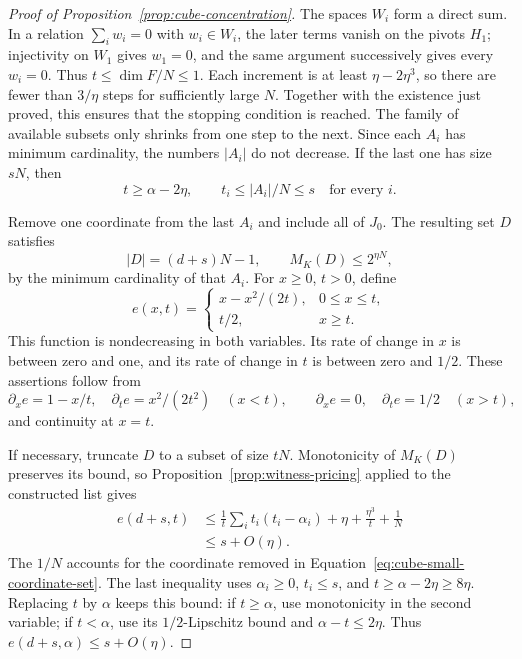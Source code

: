 \begin{proof}[Proof of Proposition~\ref{prop:cube-concentration}]
The spaces \(W_i\) form a direct sum. In a relation \(\sum_i w_i=0\)
with \(w_i\in W_i\), the later terms vanish on the pivots \(H_1\);
injectivity on \(W_1\) gives \(w_1=0\), and the same argument
successively gives every \(w_i=0\). Thus \(t\le\dim F/N\le1\).
Each increment is at least \(\eta-2\eta^3\), so there are fewer than
\(3/\eta\) steps for sufficiently large \(N\). Together with the
existence just proved, this ensures that the stopping condition is
reached. The family of available subsets only shrinks from one step
to the next. Since each \(A_i\) has minimum cardinality, the numbers
\(|A_i|\) do not decrease. If the last one has size \(sN\), then
\begin{equation}\label{eq:cube-coordinate-list}
 t\ge\alpha-2\eta,\qquad t_i\le |A_i|/N\le s
 \quad\text{for every }i.
\end{equation}

Remove one coordinate from the last \(A_i\) and include all of \(J_0\).
The resulting set \(D\) satisfies
\begin{equation}\label{eq:cube-small-coordinate-set}
 |D|=(d+s)N-1,\qquad M_K(D)\le2^{\eta N},
\end{equation}
by the minimum cardinality of that \(A_i\). For \(x\ge0\), \(t>0\),
define
\[
 e(x,t)=
 \begin{cases}
 x-x^2/(2t),&0\le x\le t,\\
 t/2,&x\ge t.
 \end{cases}
\]
This function is nondecreasing in both variables. Its rate of change
in \(x\) is between zero and one, and its rate of change in \(t\) is
between zero and \(1/2\). These assertions follow from
\[
 \partial_x e=1-x/t,\quad \partial_t e=x^2/(2t^2)\quad(x<t),
 \qquad
 \partial_x e=0,\quad \partial_t e=1/2\quad(x>t),
\]
and continuity at \(x=t\).

If necessary, truncate \(D\) to a subset of size \(tN\).
Monotonicity of \(M_K(D)\) preserves its bound, so
Proposition~\ref{prop:witness-pricing} applied to the constructed list
gives
\[
 \begin{split}
 e(d+s,t)
 &\le \frac1t\sum_i t_i(t_i-\alpha_i)
       +\eta+\frac{\eta^3}{t}+\frac1N\\
 &\le s+O(\eta).
 \end{split}
\]
The \(1/N\) accounts for the coordinate removed in
Equation~\eqref{eq:cube-small-coordinate-set}. The last inequality
uses \(\alpha_i\ge0\), \(t_i\le s\), and
\(t\ge\alpha-2\eta\ge8\eta\). Replacing \(t\) by \(\alpha\) keeps
this bound: if \(t\ge\alpha\), use monotonicity in the second
variable; if \(t<\alpha\), use its \(1/2\)-Lipschitz bound and
\(\alpha-t\le2\eta\). Thus \(e(d+s,\alpha)\le s+O(\eta)\).


\end{proof}
